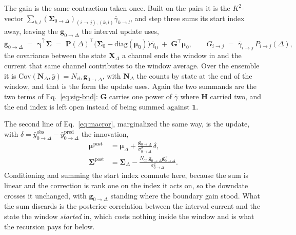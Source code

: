 The gain is the same contraction taken once. Built on the pairs it is the $K^2$-vector
$\sum_{k,l}(\bm{\Sigma}_{0\to\Delta})_{(i\to j),(k,l)}
\bar{\gamma}_{k\to l}$, and step three sums its start index away, leaving the
$\mathbf{g}_{0\to\Delta}$ the interval update uses,
\begin{equation}
  \mathbf{g}_{0\to\Delta} \;=\; \widetilde{\bm{\gamma}^\top\bm{\Sigma}}
  \;=\; \mathbf{P}(\Delta)^\top\bigl(\bm{\Sigma}_0-\mathrm{diag}(\bm{\mu}_0)\bigr)\bar{\bm{\gamma}}_0
  \;+\; \mathbf{G}^\top\bm{\mu}_0,
  \qquad
  G_{i\to j} \;=\; \bar{\gamma}_{i\to j}\,P_{i\to j}(\Delta),
  \label{eq:vector-tilde}
\end{equation}
the covariance between the state $\mathbf{X}_\Delta$ a channel ends the window in and the
current that same channel contributes to the window average. Over the ensemble it is
$\mathrm{Cov}(\mathbf{N}_\Delta,\bar{y})=N_{\mathrm{ch}}\,\mathbf{g}_{0\to\Delta}$, with $\mathbf{N}_\Delta$
the counts by state at the end of the window, and that is the form the update uses.
Again the two summands are the two terms of Eq.~\ref{eq:sig-bnd}:
$\mathbf{G}$ carries one power of $\bar{\gamma}$ where $\mathbf{H}$ carried two, and the
end index is left open instead of being summed against $\mathbf{1}$.

The second line of Eq.~\ref{eq:macror}, marginalized the same way, is the update, with
$\delta = \bar{y}^{\mathrm{obs}}_{0\to\Delta} - \bar{y}^{\mathrm{pred}}_{0\to\Delta}$ the innovation,
\begin{align}
  \bm{\mu}^{\mathrm{post}} &= \bm{\mu}_\Delta + \frac{\mathbf{g}_{0\to\Delta}}{\sigma^2_{0\to\Delta}}\,\delta, \label{eq:mu-post}\\
  \bm{\Sigma}^{\mathrm{post}} &= \bm{\Sigma}_\Delta - \frac{N_{\mathrm{ch}}\,\mathbf{g}_{0\to\Delta}\mathbf{g}_{0\to\Delta}^\top}{\sigma^2_{0\to\Delta}}. \label{eq:sig-post}
\end{align}
Conditioning and summing the start index commute here, because the sum is linear and the
correction is rank one on the index it acts on, so the downdate crosses it unchanged, with
$\mathbf{g}_{0\to\Delta}$ standing where the boundary gain stood. What the sum discards is the posterior correlation
between the interval current and the state the window \emph{started} in, which costs nothing
inside the window and is what the recursion pays for below.

